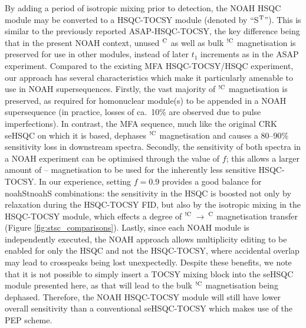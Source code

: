 \documentclass[11pt]{article}
\newcommand*{\noahtwo}[2]{\csname noah#1\endcsname\csname noah#2\endcsname}
\newcommand*{\noahSt}{S$\rm ^T$}
\newcommand*{\hl}[1]{\textcolor{WildStrawberry}{#1}}
\newcommand*{\carbon}{\ce{^{13}C}}
\newcommand*{\proton}{\ce{^{1}H}}
\newcommand*{\magn}[1]{\ce{^1H}$^{#1}$}
\newcommand*{\magnnot}[1]{\ce{^1H}$^{!#1}$}
\newcommand*{\figref}[1]{Figure \ref{fig:#1}}
\begin{document}
By adding a period of isotropic mixing prior to detection, the NOAH HSQC module may be converted to a HSQC-TOCSY module (denoted by ``\noahSt{}'').
This is similar to the previously reported ASAP-HSQC-TOCSY,\autocite{Becker2019JMR} the key difference being that in the present NOAH context, unused \magn{\ce{C}} as well as bulk \magnnot{\ce{C}} magnetisation is preserved for use in other modules, instead of later $t_1$ increments as in the ASAP experiment.
Compared to the existing MFA HSQC-TOCSY/HSQC experiment,\autocite{Nolis2019CPC} our approach has several characteristics which make it particularly amenable to use in NOAH supersequences.
Firstly, the vast majority of \magnnot{\ce{C}} magnetisation is preserved, as required for homonuclear module(s) to be appended in a NOAH supersequence (in practice, losses of ca.\ 10\% are observed due to pulse imperfections).
In contrast, the MFA sequence, much like the original CRK seHSQC on which it is based, dephases \magnnot{\ce{C}} magnetisation and causes a 80--90\% sensitivity loss in downstream spectra.
Secondly, the sensitivity of both spectra in a NOAH experiment can be optimised through the value of $f$; this allows a larger amount of \carbon{}--\proton{} magnetisation to be used for the inherently less sensitive HSQC-TOCSY.
\hl{In our experience, setting $f = 0.9$ provides a good balance for \noahtwo{St}{S} combinations: the sensitivity in the HSQC is boosted not only by relaxation during the HSQC-TOCSY FID, but also by the isotropic mixing in the HSQC-TOCSY module, which effects a degree of \magnnot{\ce{C}}\,$\to\,$\magn{\ce{C}} magnetisation transfer (\figref{stsc_comparisons}).}
Lastly, since each NOAH module is independently executed, the NOAH approach allows multiplicity editing to be enabled for only the HSQC and not the HSQC-TOCSY, where accidental overlap may lead to crosspeaks being lost unexpectedly.
Despite these benefits, we note that it is not possible to simply insert a TOCSY mixing block into the seHSQC module presented here, as that will lead to the bulk \magnnot{\ce{C}} magnetisation being dephased.
Therefore, the NOAH HSQC-TOCSY module will still have lower overall sensitivity than a conventional seHSQC-TOCSY which makes use of the PEP scheme.

\end{document}
